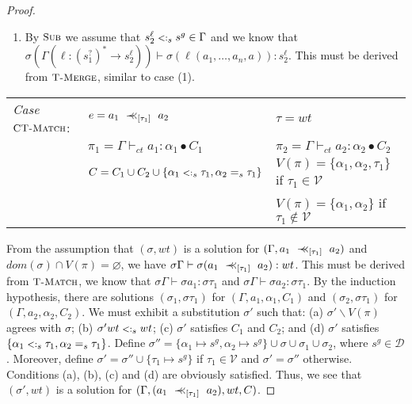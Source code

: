 \documentclass{eptcs}
\newcommand{\ih}{induction hypothesis\xspace}
\newcommand{\VV}{\ensuremath{\mathcal{V}}\xspace}
\newcommand{\caD}{\ensuremath{\mathcal{D}}\xspace}
\newcommand{\CC}{\ensuremath{C}\xspace}
\newcommand{\match}{\mathrel{\mbox{$\prec\hspace{-0.5em}\prec$}}}
\newcommand{\TMerge}{{\small \textsc{T-Merge}}}
\newcommand{\Sub}{{\small \textsc{Sub}}}
\newcommand{\TMatch}{{\small \textsc{T-Match}}}
\newcommand{\CTMatch}{{\small \textsc{CT-Match}}}
\newcommand{\sub}{\mathrel{\mbox{{\footnotesize $<:$}}}}
\newcommand{\wt}[0]{{\ensuremath{wt}}}
\newcommand{\ctvdash}{\ensuremath{\vdash_{ct}}}
\newcommand{\vsig}[2]{\ensuremath{{#1}^*\rightarrow{#2}}}
\begin{document}
\begin{proof}
\begin{enumerate}
\item By $\Sub$ we assume that $s_2^{\ell} \sub_s s^g \in \Gamma$ and we know that
$\sigma(\Gamma(\ell : \vsig{(s_1^?)}{s_2^{\ell}})) \vdash \sigma(\ell(a_1, \dots, a_n, a))
: s_2^{\ell}$. This must be derived from $\TMerge$, similar to case (1). 
\end{enumerate}

\begin{flushleft}
\begin{tabular}{lll}
        \textit{Case} $\CTMatch$:       & $e = a_1 ~\match_{[\tau_1]}~ a_2$
                                & $\tau = \wt$                  \\
                                
                                & $\pi_1 = \Gamma \ctvdash a_1 : \alpha_1 \bullet \CC_1$                        
                                & $\pi_2 = \Gamma \ctvdash a_2 : \alpha_2 \bullet \CC_2$                                        \\
                                
                                & $\CC = \CC_1 \cup \CC_2 \cup \{\alpha_1 \sub_s
\tau_1, \alpha_2 =_s \tau_1\}$
                                & $V(\pi) = \{\alpha_1, \alpha_2, \tau_1\}$ if $\tau_1 \in \VV$         \\
                                & & $V(\pi) = \{\alpha_1, \alpha_2\}$ if $\tau_1
\notin \VV$     \\ 
\end{tabular}
\end{flushleft}

From the assumption that $(\sigma,\wt)$ is a solution for $(\Gamma, a_1 ~\match_{[\tau_1]}~ a_2)$ and $dom(\sigma) \cap V(\pi) = \varnothing$, we have
$\sigma\Gamma \vdash \sigma(a_1 ~\match_{[\tau_1]}~ a_2) : \wt$. This must be
derived from $\TMatch$, we know that $\sigma\Gamma \vdash \sigma a_1: \sigma\tau_1$ and
$\sigma\Gamma \vdash \sigma a_2 : \sigma\tau_1$. By the \ih, there are solutions
$(\sigma_1,\sigma\tau_1)$ for $(\Gamma, a_1, \alpha_1, \CC_1)$ and
$(\sigma_2,\sigma\tau_1)$ for $(\Gamma,a_2,\alpha_2,\CC_2)$. We must exhibit a substitution $\sigma'$ such that: (a) $\sigma'
\backslash V(\pi)$ agrees with $\sigma$; (b) $\sigma' \wt \sub_s \wt$; (c) $\sigma'$
satisfies $\CC_1$ and $\CC_2$; and (d) $\sigma'$ satisfies $\{\alpha_1 \sub_s
\tau_1, \alpha_2 =_s \tau_1\}$. Define $\sigma'' = \{\alpha_1 \mapsto s^g,
\alpha_2 \mapsto s^g\} \cup \sigma \cup \sigma_1 \cup \sigma_2$, where $s^g \in \caD$. Moreover, define $\sigma' =
\sigma'' \cup \{\tau_1 \mapsto s^g\}$ if $\tau_1 \in \VV$ and $\sigma' =
\sigma''$ otherwise. Conditions (a), (b), (c) and (d) are obviously satisfied. Thus, we
see that $(\sigma',\wt)$ is a solution for $(\Gamma, (a_1
~\match_{[\tau_1]}~ a_2), \wt, \CC)$.
\end{proof}
\end{document}
